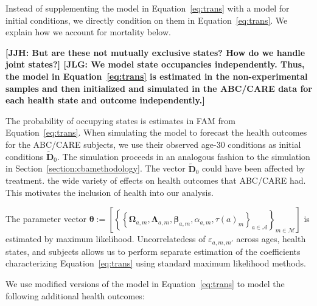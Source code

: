 Instead of supplementing the model in Equation~\eqref{eq:trans} with a model for initial conditions, we directly condition on them in Equation~\eqref{eq:trans}. We explain how we account for mortality below.

\textbf{[JJH: But are these not mutually exclusive states? How do we handle joint states?] [JLG: We model state occupancies independently. Thus, the model in Equation~\eqref{eq:trans} is estimated in the non-experimental samples and then initialized and simulated in the ABC/CARE data for each health state and outcome independently.]}

The probability of occupying states is estimates in FAM from Equation~\eqref{eq:trans}. When simulating the model to forecast the health outcomes for the ABC/CARE subjects, we use their observed age-30 conditions as initial conditions  $\tilde{\bm{D}}_0$. The simulation proceeds in an analogous fashion to the simulation in Section~\ref{section:cbamethodology}. The vector $\tilde{\bm{D}}_0$ could have been affected by treatment. \citet{Campbell_Conti_etal_2014_EarlyChildhoodInvestments} the wide variety of effects on health outcomes that ABC/CARE had. This motivates the inclusion of health into our analysis.

\noindent The parameter vector $\bm{\theta} := \left[ \left\{ \left\{  \bm{\Omega}_{a,m}, \bm{\Lambda}_{a,m}, \bm{\beta}_{a,m}, \alpha_{a,m}, \tau \left( a \right) _{m}  \right\}_{a \in \mathcal{A}} \right\}_{m \in \mathcal{M}} \right]$ is estimated by maximum likelihood. Uncorrelatedess of $\varepsilon_{a,m,m'}$ across ages, health states, and subjects allows us to perform separate estimation of the coefficients characterizing Equation~\eqref{eq:trans} using standard maximum likelihood methods.

We use modified versions of the model in Equation~\eqref{eq:trans} to model the following additional health outcomes: 

